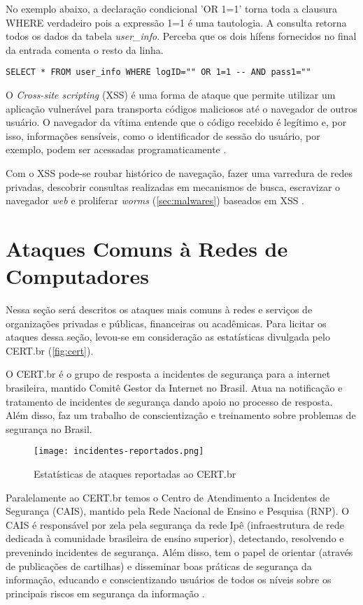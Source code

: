 No exemplo abaixo, a declaração condicional 'OR 1=1' torna toda a clausura WHERE verdadeiro pois a expressão 1=1 é uma tautologia. A consulta retorna todos os dados da tabela \textit{user\_info}. Perceba que os dois hífens fornecidos no final da entrada comenta o resto da linha.

\begin{lstlisting}[Language=SQL]
  SELECT * FROM user_info WHERE logID="" OR 1=1 -- AND pass1="" 
\end{lstlisting}

O \textit{Cross-site scripting} (XSS) é uma forma de ataque que permite utilizar um aplicação vulnerável para transporta códigos maliciosos até o navegador de outros usuário. O navegador da vítima entende que o código recebido é legítimo e, por isso, informações sensíveis, como o identificador de sessão do usuário, por exemplo, podem ser acessadas programaticamente \cite{pentestweb:nelson}.

Com o XSS pode-se roubar histórico de navegação, fazer uma varredura de redes privadas, descobrir consultas realizadas em mecanismos de busca, escravizar o navegador \textit{web} e proliferar \textit{worms} (\autoref{sec:malwares}) baseados em XSS \cite{pentestweb:nelson}. 

\section{Ataques Comuns à Redes de Computadores} \label{sec:ataques-comuns}

Nessa seção será descritos os ataques mais comuns à redes e serviços de organizações privadas e públicas, financeiras ou acadêmicas. Para licitar os ataques dessa seção, levou-se em consideração as estatísticas divulgada pelo CERT.br (\autoref{fig:cert}).

O CERT.br é o grupo de resposta a incidentes de segurança para a internet brasileira, mantido Comitê Gestor da Internet no Brasil. Atua na notificação e tratamento de incidentes de segurança dando apoio no processo de resposta. Além disso, faz um trabalho de conscientização e treinamento sobre problemas de segurança no Brasil. 

\begin{figure}[htb]
 \centering
 \caption{Estatísticas de ataques reportadas ao CERT.br}
 \texttt{[image: incidentes-reportados.png]}
 \label{fig:cert}
\end{figure}

Paralelamente ao CERT.br temos o Centro de Atendimento a Incidentes de Segurança (CAIS), mantido pela Rede Nacional de Ensino e Pesquisa (RNP). O CAIS é responsável por zela pela segurança da rede Ipê (infraestrutura de rede dedicada à comunidade brasileira de ensino superior), detectando, resolvendo e prevenindo incidentes de segurança. Além disso, tem o papel de orientar (através de publicações de cartilhas) e disseminar boas práticas de segurança da informação, educando e conscientizando usuários de todos os níveis sobre os principais riscos em segurança da informação \cite{cais}.

